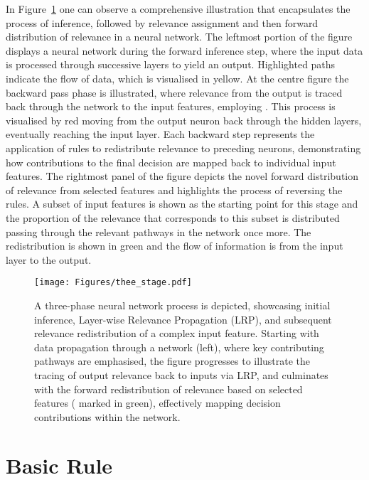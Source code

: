In Figure~\ref{Fig:thee_stage} one can observe a comprehensive illustration that encapsulates the process of inference, followed by relevance assignment and then forward distribution of relevance in a neural network. The leftmost portion of the figure displays a neural network during the forward inference step, where the input data is processed through successive layers to yield an output. Highlighted paths indicate the flow of data, which is visualised in yellow. At the centre figure the backward pass phase is illustrated, where relevance from the output is traced back through the network to the input features, employing \LRP\/. This process is visualised by red moving from the output neuron back through the hidden layers, eventually reaching the input layer. Each backward step represents the application of \LRP\/ rules to redistribute relevance to preceding neurons, demonstrating how contributions to the final decision are mapped back to individual input features. The rightmost panel of the figure depicts the novel forward distribution of relevance from selected features and highlights the process of reversing the \LRP\/ rules.
A subset of input features is shown as the starting point for this stage and the proportion of the relevance that corresponds to this subset is distributed passing through the relevant pathways in the network once more. The redistribution is shown in green and the flow of information is from the input layer to the output. 

\begin{figure}[ht!]
\begin{center}
\texttt{[image: Figures/thee\_stage.pdf]}
\caption{A three-phase neural network process is depicted, showcasing initial inference, Layer-wise Relevance Propagation (LRP), and subsequent relevance redistribution of a complex input feature. Starting with data propagation through a network (left), where key contributing pathways are emphasised, the figure progresses to illustrate the tracing of output relevance back to inputs via LRP, and culminates with the forward redistribution of relevance based on selected features ( marked in green), effectively mapping decision contributions within the network.}
\label{Fig:thee_stage}
\end{center}
\end{figure}


\section{Basic Rule}

